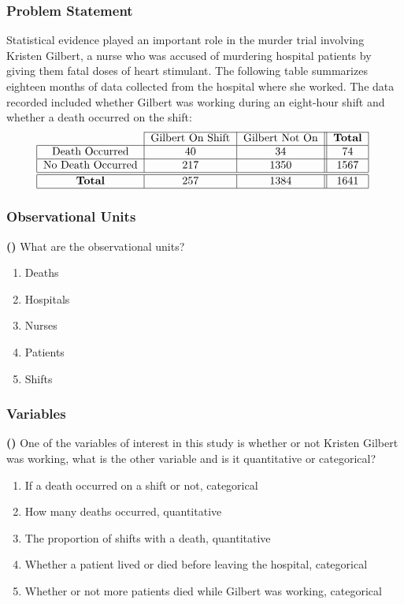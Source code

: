 \documentclass[13pt]{beamer}
\newcounter{count}
\newcommand{\question}{ \textbf{(\decimal{count})} \stepcounter{count}}
\begin{document}
\begin{frame}%

\frametitle{Problem Statement}%


Statistical evidence played an important role in the murder trial involving
Kristen Gilbert, a nurse who was accused of murdering hospital patients by
giving them fatal doses of heart stimulant. The following table summarizes
eighteen months of data collected from the hospital where she worked. The data
recorded included whether Gilbert was working during an eight-hour shift and
whether a death occurred on the shift:%
\[%
\begin{tabular}
[c]{c|c|c||c|}\cline{2-4}
& Gilbert On Shift & Gilbert Not On & \textbf{Total}\\\hline
\multicolumn{1}{|c|}{Death Occurred} & 40 & 34 & 74\\\hline
\multicolumn{1}{|c|}{No Death Occurred} & 217 & 1350 & 1567\\\hline\hline
\multicolumn{1}{|c|}{\textbf{Total}} & 257 & 1384 & 1641\\\hline
\end{tabular}
\
\]%
\end{frame}%


\begin{frame}%
\frametitle{Observational Units}%

\question What are the observational units?

\begin{enumerate}[A]
	\item Deaths
	\item Hospitals
	\item Nurses
	\item Patients
	\item Shifts
\end{enumerate}


\end{frame}%

\begin{frame}
\frametitle{Variables}%

\question One of the variables of interest in this study is whether or not
Kristen Gilbert was working, what is the other variable and is it quantitative
or categorical?

\begin{enumerate}[A]
	\item If a death occurred on a shift or not, categorical
	\item How many deaths occurred, quantitative
	\item The proportion of shifts with a death, quantitative
	\item Whether a patient lived or died before leaving the hospital, categorical
	\item Whether or not more patients died while Gilbert was working, categorical
\end{enumerate}

\end{frame}%
\end{document}
